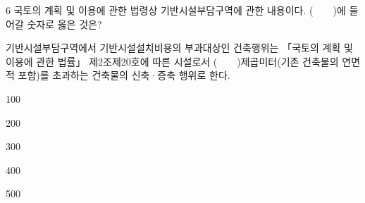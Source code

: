 \begin{question}{6}
국토의 계획 및 이용에 관한 법령상 기반시설부담구역에 관한 내용이다. (　　)에 들어갈 숫자로 옳은 것은?
\begin{framedtext}
기반시설부담구역에서 기반시설설치비용의 부과대상인 건축행위는 「국토의 계획 및 이용에 관한 법률」 제2조제20호에 따른 시설로서 (　　)제곱미터(기존 건축물의 연면적 포함)를 초과하는 건축물의 신축·증축 행위로 한다. \par
\end{framedtext}
\begin{choices}
  \item 100
  \item 200
  \item 300
  \item 400
  \item 500
\end{choices}
\end{question}
